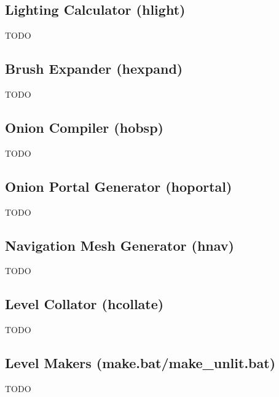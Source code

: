 \subsection{Lighting Calculator (hlight)}

TODO

\subsection{Brush Expander (hexpand)}

TODO

\subsection{Onion Compiler (hobsp)}

TODO

\subsection{Onion Portal Generator (hoportal)}

TODO

\subsection{Navigation Mesh Generator (hnav)}

TODO

\subsection{Level Collator (hcollate)}

TODO

\subsection{Level Makers (make.bat/make\_unlit.bat)}

TODO
